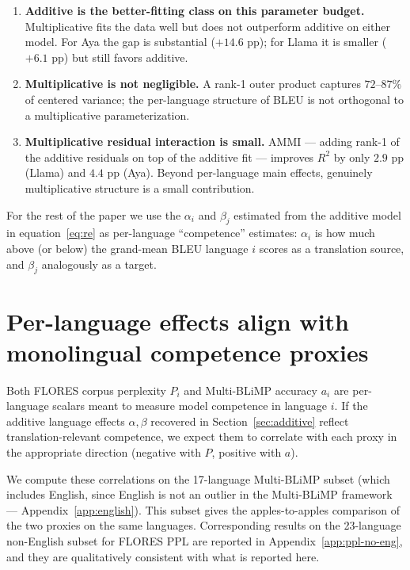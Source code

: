 \documentclass[11pt]{article}
\begin{document}
\begin{enumerate}
  \item \textbf{Additive is the better-fitting class on this parameter
    budget.} Multiplicative fits the data well but does not outperform
    additive on either model. For Aya the gap is substantial
    ($+14.6$ pp); for Llama it is smaller ($+6.1$ pp) but still favors
    additive.
  \item \textbf{Multiplicative is not negligible.} A rank-1 outer
    product captures $72$--$87\%$ of centered variance; the per-language
    structure of BLEU is not orthogonal to a multiplicative
    parameterization.
  \item \textbf{Multiplicative residual interaction is small.} AMMI
    --- adding rank-1 of the additive residuals on top of the additive
    fit --- improves $R^2$ by only $2.9$ pp (Llama) and $4.4$ pp (Aya).
    Beyond per-language main effects, genuinely multiplicative
    structure is a small contribution.
\end{enumerate}

For the rest of the paper we use the $\alpha_i$ and $\beta_j$ estimated
from the additive model in equation~\eqref{eq:re} as per-language
``competence'' estimates: $\alpha_i$ is how much above (or below) the
grand-mean BLEU language $i$ scores as a translation source, and
$\beta_j$ analogously as a target.

\section{Per-language effects align with monolingual competence proxies}
\label{sec:correlations}

Both FLORES corpus perplexity $P_i$ and Multi-BLiMP accuracy $a_i$ are
per-language scalars meant to measure model competence in language $i$.
If the additive language effects $\alpha, \beta$ recovered in
Section~\ref{sec:additive} reflect translation-relevant competence, we
expect them to correlate with each proxy in the appropriate direction
(negative with $P$, positive with $a$).

We compute these correlations on the 17-language Multi-BLiMP subset
(which includes English, since English is not an outlier in the
Multi-BLiMP framework --- Appendix~\ref{app:english}). This subset
gives the apples-to-apples comparison of the two proxies on the same
languages. Corresponding results on the 23-language non-English subset
for FLORES PPL are reported in Appendix~\ref{app:ppl-no-eng}, and they
are qualitatively consistent with what is reported here.
\end{document}
